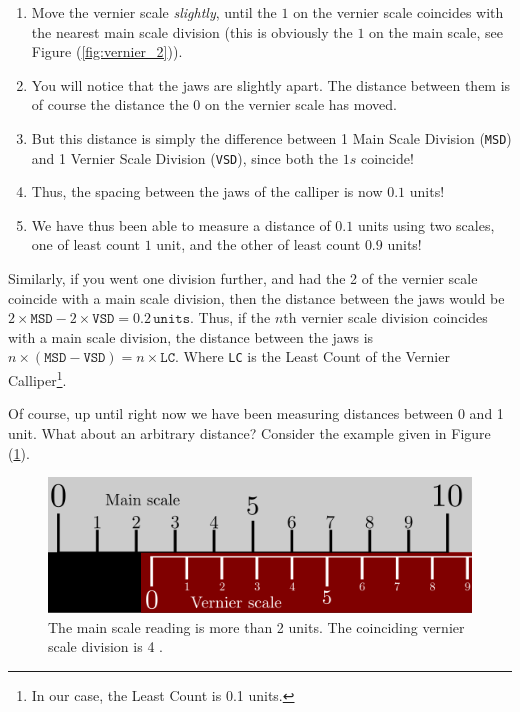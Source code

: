 \begin{enumerate}
    \item Move the vernier scale \textit{slightly}, until the $1$ on the vernier scale coincides with the nearest main scale division (this is obviously the $1$ on the main scale, see Figure (\ref{fig:vernier_2})).
    
    \item You will notice that the jaws are slightly apart. The distance between them is of course the distance the $0$ on the vernier scale has moved.
    
    \item But this distance is simply the difference between 1 Main Scale Division (\texttt{MSD}) and 1 Vernier Scale Division (\texttt{VSD}), since both the $1s$ coincide!
    
    \item Thus, the spacing between the jaws of the calliper is now $0.1$ units!
    
    \item We have thus been able to measure a distance of $0.1$ units using two scales, one of least count $1$ unit, and the other of least count $0.9$ units!
\end{enumerate}

Similarly, if you went one division further, and had the 2 of the vernier scale coincide with a main scale division, then the distance between the jaws would be $2\times\texttt{MSD}-2\times\texttt{VSD}=0.2\, \texttt{units}$. Thus, if the $n$th vernier scale division coincides with a main scale division, the distance between the jaws is $n \times (\texttt{MSD}-\texttt{VSD})=n \times \texttt{LC}$. Where \texttt{LC} is the Least Count of the Vernier Calliper\footnote{In our case, the Least Count is 0.1 units.}.

Of course, up until right now we have been measuring distances between 0 and 1 unit.  What about an arbitrary distance? Consider the example given in Figure (\ref{fig:vernier_4}). 

\begin{figure}[!htb]
    \centering
    \includegraphics[scale=0.75]{figs/vernier4.png}
    \caption{The main scale reading is more than 2 units. The coinciding vernier scale division is 4 . }
    \label{fig:vernier_4}
\end{figure}

